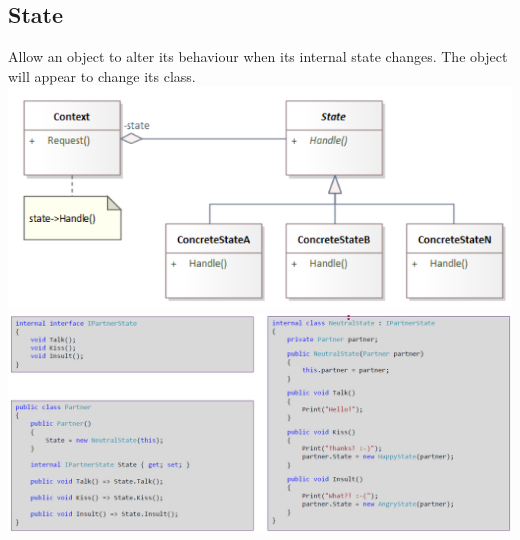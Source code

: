 \subsection{State}
Allow an object to alter its behaviour when its internal state changes. The object will appear to change its class.
\includegraphics[width=0.85\linewidth]{../img/state_pattern.png}
\includegraphics[width=\linewidth]{../img/state_pattern_code.png}

